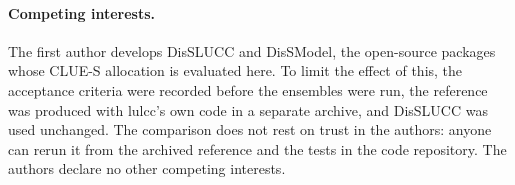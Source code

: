 \paragraph{Competing interests.} The first author develops DisSLUCC and DisSModel, the
open-source packages whose CLUE-S allocation is evaluated here. To limit the effect of
this, the acceptance criteria were recorded before the ensembles were run, the reference
was produced with lulcc's own code in a separate archive, and DisSLUCC was used
unchanged. The comparison does not rest on trust in the authors: anyone can rerun it
from the archived reference and the tests in the code repository. The authors declare no
other competing interests.



